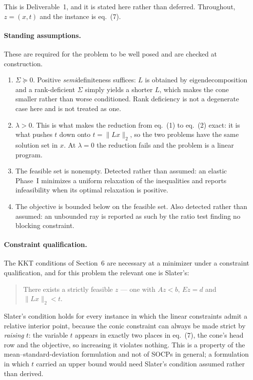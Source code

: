 \documentclass[11pt,a4paper]{article}
\begin{document}
This is Deliverable~1, and it is stated here rather than deferred.
Throughout, $z=(x,t)$ and the instance is eq.~(7).

\paragraph{Standing assumptions.} These are required for the problem
to be well posed and are checked at construction.

\begin{enumerate}
    \item $\Sigma\succeq0$. Positive \emph{semi}definiteness suffices:
    $L$ is obtained by eigendecomposition and a rank-deficient
    $\Sigma$ simply yields a shorter $L$, which makes the cone smaller
    rather than worse conditioned. Rank deficiency is not a degenerate
    case here and is not treated as one.

    \item $\lambda>0$. This is what makes the reduction from eq.~(1)
    to eq.~(2) exact: it is what pushes $t$ down onto $t=\|Lx\|_2$, so
    the two problems have the same solution set in $x$. At $\lambda=0$
    the reduction fails and the problem is a linear program.

    \item The feasible set is nonempty. Detected rather than assumed:
    an elastic Phase~I minimizes a uniform relaxation of the
    inequalities and reports infeasibility when its optimal relaxation
    is positive.

    \item The objective is bounded below on the feasible set. Also
    detected rather than assumed: an unbounded ray is reported as such
    by the ratio test finding no blocking constraint.
\end{enumerate}

\paragraph{Constraint qualification.} The KKT conditions of
Section~6 are necessary at a minimizer under a constraint
qualification, and for this problem the relevant one is Slater's:

\begin{quote}
There exists a strictly feasible $z$ --- one with $Az<b$, $Ez=d$ and
$\|Lx\|_2<t$.
\end{quote}

Slater's condition holds for every instance in which the linear
constraints admit a relative interior point, because the conic
constraint can always be made strict by \emph{raising} $t$: the
variable $t$ appears in exactly two places in eq.~(7), the cone's head
row and the objective, so increasing it violates nothing. This is a
property of the mean--standard-deviation formulation and not of SOCPs
in general; a formulation in which $t$ carried an upper bound would
need Slater's condition assumed rather than derived.
\end{document}
